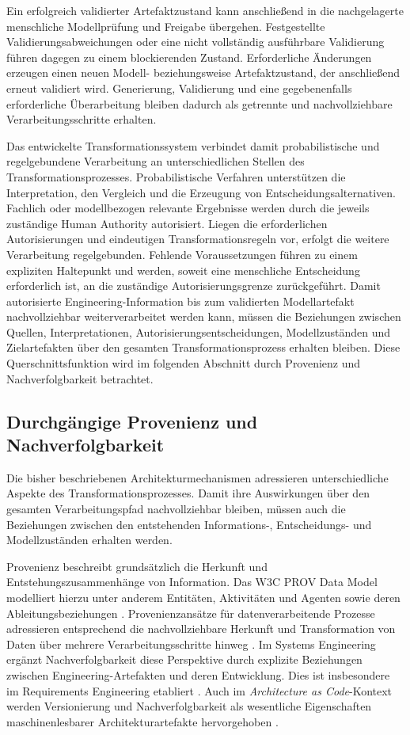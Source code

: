 Ein erfolgreich validierter Artefaktzustand kann anschließend in die
nachgelagerte menschliche Modellprüfung und Freigabe übergehen.
Festgestellte Validierungsabweichungen oder eine nicht vollständig
ausführbare Validierung führen dagegen zu einem blockierenden Zustand.
Erforderliche Änderungen erzeugen einen neuen Modell- beziehungsweise
Artefaktzustand, der anschließend erneut validiert wird. Generierung,
Validierung und eine gegebenenfalls erforderliche Überarbeitung bleiben
dadurch als getrennte und nachvollziehbare Verarbeitungsschritte erhalten.

Das entwickelte Transformationssystem verbindet damit probabilistische und
regelgebundene Verarbeitung an unterschiedlichen Stellen des
Transformationsprozesses. Probabilistische Verfahren unterstützen die
Interpretation, den Vergleich und die Erzeugung von
Entscheidungsalternativen. Fachlich oder modellbezogen relevante Ergebnisse
werden durch die jeweils zuständige Human Authority autorisiert. Liegen die
erforderlichen Autorisierungen und eindeutigen Transformationsregeln vor,
erfolgt die weitere Verarbeitung regelgebunden. Fehlende Voraussetzungen
führen zu einem expliziten Haltepunkt und werden, soweit eine menschliche
Entscheidung erforderlich ist, an die zuständige Autorisierungsgrenze
zurückgeführt.
\newpage 
Damit autorisierte Engineering-Information bis zum validierten
Modellartefakt nachvollziehbar weiterverarbeitet werden kann, müssen die
Beziehungen zwischen Quellen, Interpretationen,
Autorisierungsentscheidungen, Modellzuständen und Zielartefakten über den
gesamten Transformationsprozess erhalten bleiben. Diese Querschnittsfunktion
wird im folgenden Abschnitt durch Provenienz und Nachverfolgbarkeit
betrachtet.

\subsection{Durchgängige Provenienz und Nachverfolgbarkeit}
\label{sec:architecture_traceability}

Die bisher beschriebenen Architekturmechanismen adressieren unterschiedliche
Aspekte des Transformationsprozesses. Damit ihre Auswirkungen über den
gesamten Verarbeitungspfad nachvollziehbar bleiben, müssen auch die
Beziehungen zwischen den entstehenden Informations-, Entscheidungs- und
Modellzuständen erhalten werden.

Provenienz beschreibt grundsätzlich die Herkunft und
Entstehungszusammenhänge von Information. Das W3C PROV Data Model modelliert
hierzu unter anderem Entitäten, Aktivitäten und Agenten sowie deren
Ableitungsbeziehungen \cite{MoreauMissier2013}. Provenienzansätze für
datenverarbeitende Prozesse adressieren entsprechend die nachvollziehbare
Herkunft und Transformation von Daten über mehrere Verarbeitungsschritte
hinweg \cite{Simmhan2005}. Im Systems Engineering ergänzt
Nachverfolgbarkeit diese Perspektive durch explizite Beziehungen zwischen
Engineering-Artefakten und deren Entwicklung. Dies ist insbesondere im
Requirements Engineering etabliert \cite{ISO29148}. Auch im
\emph{Architecture as Code}-Kontext werden Versionierung und
Nachverfolgbarkeit als wesentliche Eigenschaften maschinenlesbarer
Architekturartefakte hervorgehoben \cite{Bucaioni2025}.

